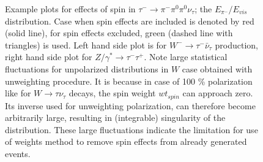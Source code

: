 \documentclass{article}
\begin{document}
\begin{figure}[h!]
\centering 
{}
 \caption{\label{Fig:A1} Example  plots for effects of spin
in  $\tau^- \to \pi^- \pi^0\pi^0 \nu_\tau$; the $E_{\pi^-} / E_{vis}$ distribution.
Case when spin effects are included is denoted by red (solid line), for 
spin effects excluded, green (dashed line with triangles) is used. Left hand side plot is for 
$W^- \to \tau^- \bar \nu_\tau$ production, right hand side plot 
for $Z/\gamma^* \to \tau^- \tau^+$. Note large statistical fluctuations for 
unpolarized distributions in $W$ case obtained with unweighting procedure. 
It is because in case of 100 \% polarization like for $W\to \tau \nu_\tau$ decays, 
the spin weight $wt_{spin}$ can approach zero. Its inverse
 used for unweighting polarization, can therefore become arbitrarily large, resulting in (integrable)
singularity of the distribution. These large fluctuations  indicate the limitation for 
use of weights method to remove spin effects from already generated events.}
\end{figure}
\end{document}

